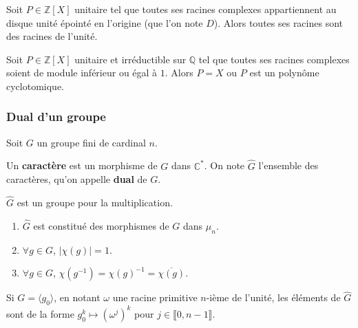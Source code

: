 
	\begin{theorem}[Kronecker]
		Soit $P \in \mathbb{Z}[X]$ unitaire tel que toutes ses racines complexes appartiennent au disque unité épointé en l'origine (que l'on note $D$). Alors toutes ses racines sont des racines de l'unité.
	\end{theorem}

	\begin{corollary}
		Soit $P \in \mathbb{Z}[X]$ unitaire et irréductible sur $\mathbb{Q}$ tel que toutes ses racines complexes soient de module inférieur ou égal à $1$. Alors $P = X$ ou $P$ est un polynôme cyclotomique.
	\end{corollary}

	\subsubsection{Dual d'un groupe}

	Soit $G$ un groupe fini de cardinal $n$.


	\begin{definition}
		Un \textbf{caractère} est un morphisme de $G$ dans $\mathbb{C}^*$. On note $\widehat{G}$ l'ensemble des caractères, qu'on appelle \textbf{dual} de $G$.
	\end{definition}

	\begin{proposition}
		$\widehat{G}$ est un groupe pour la multiplication.
	\end{proposition}

	\begin{proposition}
		\begin{enumerate}[label=(\roman*)]
			\item $\widehat{G}$ est constitué des morphismes de $G$ dans $\mu_n$.
			\item $\forall g \in G$, $\vert \chi(g) \vert = 1$.
			\item $\forall g \in G$, $\chi(g^{-1}) = \chi(g)^{-1} = \overline{\chi(g)}$.
		\end{enumerate}
	\end{proposition}

	\begin{proposition}
		Si $G = \langle g_0 \rangle$, en notant $\omega$ une racine primitive $n$-ième de l'unité, les éléments de $\widehat{G}$ sont de la forme $g_0^k \mapsto (\omega^j)^k$ pour $j \in \llbracket 0, n-1 \rrbracket$.
	\end{proposition}

